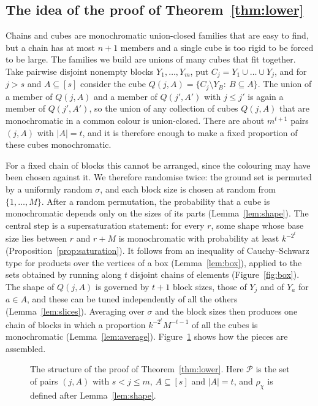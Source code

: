 \documentclass[11pt,reqno]{amsart}
\numberwithin{equation}{section}
\theoremstyle{plain}
\theoremstyle{definition}
\theoremstyle{remark}
\newcommand{\cP}{\mathcal{P}}
\begin{document}
\subsection{The idea of the proof of Theorem~\ref{thm:lower}}

Chains and cubes are monochromatic union-closed families that are easy to
find, but a chain has at most $n+1$ members and a single cube is too
rigid to be forced to be large. The families we build are unions of many
cubes that fit together. Take pairwise disjoint nonempty blocks
$Y_1,\dots,Y_m$, put $C_j=Y_1\cup\dots\cup Y_j$, and for $j>s$ and
$A\subseteq[s]$ consider the cube $Q(j,A)=\{C_j\setminus Y_B:\ B\subseteq
A\}$. The union of a member of $Q(j,A)$ and a member of $Q(j',A')$ with
$j\le j'$ is again a member of $Q(j',A')$, so the union of any collection
of cubes $Q(j,A)$ that are monochromatic in a common colour is
union-closed. There are about $m^{t+1}$ pairs $(j,A)$ with $|A|=t$, and it
is therefore enough to make a fixed proportion of these cubes
monochromatic.

For a fixed chain of blocks this cannot be arranged, since the colouring
may have been chosen against it. We therefore randomise twice: the ground
set is permuted by a uniformly random $\sigma$, and each block size is
chosen at random from $\{1,\dots,M\}$. After a random permutation, the
probability that a cube is monochromatic depends only on the sizes of its
parts (Lemma~\ref{lem:shape}). The central step is a supersaturation
statement: for every $r$, some shape whose base size lies between $r$ and
$r+M$ is monochromatic with probability at least $k^{-2^{t}}$
(Proposition~\ref{prop:saturation}). It follows from an inequality of
Cauchy--Schwarz type for products over the vertices of a box
(Lemma~\ref{lem:box}), applied to the sets obtained by running along $t$
disjoint chains of elements (Figure~\ref{fig:box}). The shape of $Q(j,A)$
is governed by $t+1$ block sizes, those of $Y_j$ and of $Y_a$ for $a\in
A$, and these can be tuned independently of all the others
(Lemma~\ref{lem:slices}). Averaging over $\sigma$ and the block sizes then
produces one chain of blocks in which a proportion $k^{-2^{t}}M^{-t-1}$ of
all the cubes is monochromatic (Lemma~\ref{lem:average}).
Figure~\ref{fig:proofmap} shows how the pieces are assembled.

\begin{figure}[t]
\centering

\caption{The structure of the proof of Theorem~\ref{thm:lower}. Here
$\cP$ is the set of pairs $(j,A)$ with $s<j\le m$, $A\subseteq[s]$ and
$|A|=t$, and $\rho_\chi$ is defined after Lemma~\ref{lem:shape}.}
\label{fig:proofmap}
\end{figure}
\end{document}
